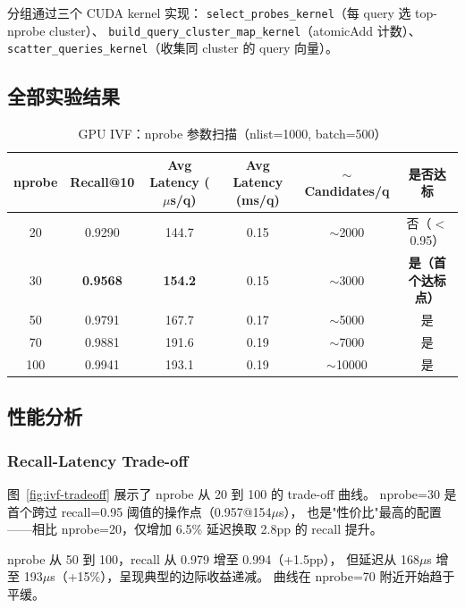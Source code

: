 \documentclass[UTF8,a4paper,10pt]{ctexart}
\begin{document}
分组通过三个 CUDA kernel 实现：
\texttt{select\_probes\_kernel}（每 query 选 top-nprobe cluster）、
\texttt{build\_query\_cluster\_map\_kernel}（atomicAdd 计数）、
\texttt{scatter\_queries\_kernel}（收集同 cluster 的 query 向量）。

\subsection{全部实验结果}

\begin{table}[H]
\centering
\caption{GPU IVF：nprobe 参数扫描（nlist=1000, batch=500）}
\label{tab:ivf-all}
\begin{tabular}{cccccc}
\toprule
nprobe & Recall@10 & Avg Latency ($\mu$s/q) & Avg Latency (ms/q) & $\sim$Candidates/q & 是否达标 \\
\midrule
20  & 0.9290 & 144.7 & 0.15 & $\sim$2000 & 否（$<$0.95）\\
30  & \textbf{0.9568} & \textbf{154.2} & 0.15 & $\sim$3000 & \textbf{是（首个达标点）} \\
50  & 0.9791 & 167.7 & 0.17 & $\sim$5000 & 是 \\
70  & 0.9881 & 191.6 & 0.19 & $\sim$7000 & 是 \\
100 & 0.9941 & 193.1 & 0.19 & $\sim$10000 & 是 \\
\bottomrule
\end{tabular}
\end{table}

\subsection{性能分析}

\subsubsection{Recall-Latency Trade-off}

图~\ref{fig:ivf-tradeoff} 展示了 nprobe 从 20 到 100 的 trade-off 曲线。
nprobe=30 是首个跨过 recall=0.95 阈值的操作点（0.957@154$\mu$s），
也是"性价比"最高的配置——相比 nprobe=20，仅增加 6.5\% 延迟换取 2.8pp 的 recall 提升。

nprobe 从 50 到 100，recall 从 0.979 增至 0.994（+1.5pp），
但延迟从 168$\mu$s 增至 193$\mu$s（+15\%），呈现典型的边际收益递减。
曲线在 nprobe=70 附近开始趋于平缓。
\end{document}
